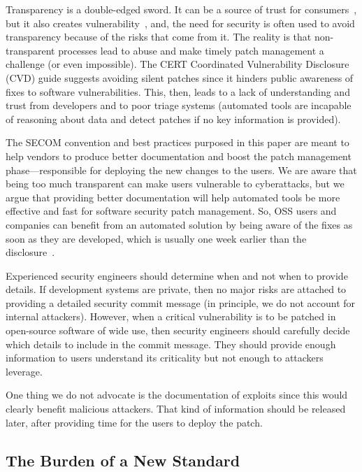  Transparency is a double-edged sword. It can be a source of trust for consumers~\cite{Householder2020}, but it also creates vulnerability~\cite{9678720}, and, the need for security is often used to avoid transparency because of the risks that come from it. The reality is that non-transparent processes lead to abuse and make timely patch management a challenge (or even impossible). The CERT Coordinated Vulnerability Disclosure (CVD) guide suggests avoiding silent patches since it hinders public awareness of fixes to software vulnerabilities. This, then, leads to a lack of understanding and trust from developers and to poor triage systems (automated tools are incapable of reasoning about data and detect patches if no key information is provided).
 
 The SECOM convention and best practices purposed in this paper are meant to 
help vendors to produce better documentation and boost the patch 
management phase---responsible for deploying the new changes to the users. We are aware that being too much transparent can make users vulnerable to cyberattacks, but we argue that providing better documentation will help automated tools be more effective and fast for software security patch management. So, OSS users and companies can benefit from an automated solution by being aware 
of the fixes as soon as they are developed, which is usually one week earlier than
the disclosure~\cite{10.1145/3133956.3134072}.  

Experienced security engineers should determine when and not when to provide details. If development systems are private, 
then no major risks are attached to providing a detailed security commit message (in principle, we do not account for internal attackers). However, when a critical vulnerability is to be patched in open-source software of wide use, then security engineers should carefully decide which details to include in the commit message. They should provide enough information to users understand its criticality but not enough to attackers leverage.

One thing we do not advocate is the documentation of exploits since this would clearly benefit malicious attackers. That kind of information should be released later, after providing time for the users to deploy the patch.

\subsection{The Burden of a New Standard}

